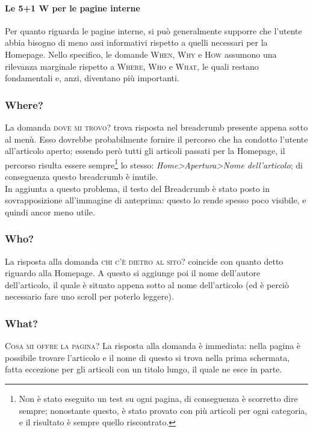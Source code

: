 \paragraph*{Le 5+1 W per le pagine interne} Per quanto riguarda le pagine interne, si può generalmente supporre che l'utente abbia bisogno di meno assi informativi rispetto a quelli necessari per la Homepage. Nello specifico, le domande \textsc{When}, \textsc{Why} e \textsc{How} assumono una rilevanza marginale rispetto a \textsc{Where}, \textsc{Who} e \textsc{What}, le quali restano fondamentali e, anzi, diventano più importanti.

\subsubsection{Where?}
La domanda \textsc{dove mi trovo?} trova risposta nel breadcrumb presente appena sotto al menù. Esso dovrebbe probabilmente fornire il percorso che ha condotto l'utente all'articolo aperto; essendo però tutti gli articoli passati per la Homepage, il percorso risulta essere sempre\footnote{Non è stato eseguito un test su ogni pagina, di conseguenza è scorretto dire sempre; nonostante questo, è stato provato con più articoli per ogni categoria, e il risultato è sempre quello riscontrato.} lo stesso: \textit{Home\textgreater}\textit{Apertura\textgreater}\textit{Nome dell'articolo}; di conseguenza questo breadcrumb è inutile.\\
In aggiunta a questo problema, il testo del Breadcrumb è stato posto in sovrapposizione all'immagine di anteprima: questo lo rende spesso poco visibile, e quindi ancor meno utile. \\

\subsubsection{Who?}
La risposta alla domanda \textsc{chi c'è dietro al sito?} coincide con quanto detto riguardo alla Homepage. A questo si aggiunge poi il nome dell'autore dell'articolo, il quale è situato appena sotto al nome dell'articolo (ed è perciò necessario fare uno scroll per poterlo leggere).

\subsubsection{What?}
\textsc{Cosa mi offre la pagina?} La risposta alla domanda è immediata: nella pagina è possibile trovare l'articolo e il nome di questo si trova nella prima schermata, fatta eccezione per gli articoli con un titolo lungo, il quale ne esce in parte.

